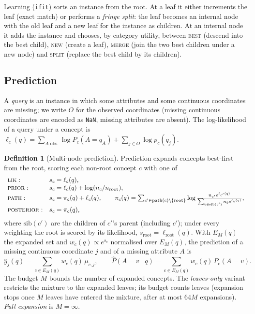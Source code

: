 \documentclass[11pt]{article}
\theoremstyle{definition}
\newtheorem{definition}[theorem]{Definition}
\theoremstyle{remark}
\newcommand{\hy}{\hat{y}}
\begin{document}
Learning (\texttt{ifit}) sorts an instance from the root.  At a leaf it either
increments the leaf (exact match) or performs a \emph{fringe split}: the leaf becomes an
internal node with the old leaf and a new leaf for the instance as children.  At an
internal node it adds the instance and chooses, by category utility, between
\textsc{best} (descend into the best child), \textsc{new} (create a leaf),
\textsc{merge} (join the two best children under a new node) and \textsc{split}
(replace the best child by its children).

\subsection{Prediction}

A \emph{query} is an instance in which some attributes and some continuous
coordinates are missing; we write $O$ for the observed coordinates (missing continuous
coordinates are encoded as \texttt{NaN}, missing attributes are absent).  The
log-likelihood of a query under a concept is
$\ell_c(q)=\sum_{A\text{ obs.}}\log P_c(A{=}q_A)+\sum_{j\in O}\log p_c(q_j)$.

\begin{definition}[Multi-node prediction]\label{def:predict}
Prediction expands concepts best-first from the root, scoring each non-root concept $c$
with one of
\[
\begin{array}{ll}
\textsc{lik}: & s_c=\ell_c(q),\\
\textsc{prior}: & s_c=\ell_c(q)+\log(n_c/n_{\text{root}}),\\
\textsc{path}: & s_c=\pi_c(q)+\ell_c(q),\qquad
  \pi_c(q)=\sum_{c'\in\text{path}(c)\setminus\{\text{root}\}}
  \log\frac{n_{c'}e^{\ell_{c'}(q)}}{\sum_{b\in\text{sib}(c')}n_b e^{\ell_b(q)}},\\
\textsc{posterior}: & s_c=\pi_c(q),
\end{array}
\]
where $\text{sib}(c')$ are the children of $c'$'s parent (including $c'$); under every
weighting the root is scored by its likelihood, $s_{\text{root}}=\ell_{\text{root}}(q)$.
With $E_M(q)$ the expanded set and $w_c(q)\propto e^{s_c}$ normalised over $E_M(q)$, the
prediction of a missing continuous coordinate $j$ and of a missing attribute $A$ is
\[
  \hy_j(q)=\sum_{c\in E_M(q)}w_c(q)\,\mu_{c,j},\qquad
  \hat P(A{=}v\mid q)=\sum_{c\in E_M(q)}w_c(q)\,P_c(A{=}v).
\]
The budget $M$ bounds the number of expanded concepts.  The \emph{leaves-only} variant
restricts the mixture to the expanded leaves; its budget counts leaves (expansion stops
once $M$ leaves have entered the mixture, after at most $64M$ expansions).  \emph{Full
expansion} is $M=\infty$.
\end{definition}
\end{document}
